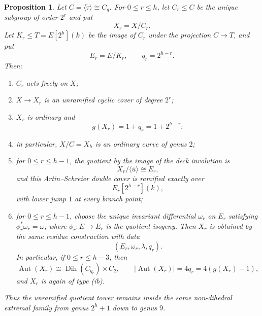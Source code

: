 \documentclass[10pt,a4paper]{amsart}
\newtheorem{proposition}{Proposition}
\newcommand{\Aut}{\operatorname{Aut}}
\newcommand{\Dih}{\operatorname{Dih}}
\begin{document}
\begin{proposition}\label{prop:tower}
Let $C=\langle\widetilde\tau\rangle\cong C_q$.  For
$0\le r\le h$, let $C_r\le C$ be the unique subgroup of order $2^r$ and
put
\[
 X_r=X/C_r.
\]
Let $K_r\le T=E[2^h](k)$ be the image of $C_r$ under the projection
$C\to T$, and put
\[
 E_r=E/K_r,\qquad q_r=2^{h-r}.
\]
Then:
\begin{enumerate}[label=\textup{(\roman*)}]
\item $C_r$ acts freely on $X$;
\item $X\to X_r$ is an unramified cyclic cover of degree $2^r$;
\item $X_r$ is ordinary and
\[
 g(X_r)=1+q_r=1+2^{h-r};
\]
\item in particular, $X/C=X_h$ is an ordinary curve of genus $2$;
\item for $0\le r\le h-1$, the quotient by the image of the deck
involution is
\[
 X_r/\langle\bar u\rangle\cong E_r,
\]
and this Artin--Schreier double cover is ramified exactly over
\[
 E_r[2^{h-r}](k),
\]
with lower jump $1$ at every branch point;
\item for $0\le r\le h-1$, choose the unique invariant differential
$\omega_r$ on $E_r$ satisfying $\phi_r^*\omega_r=\omega$, where
$\phi_r:E\to E_r$ is the quotient isogeny.  Then $X_r$ is obtained by the
same residue construction with data
\[
 (E_r,\omega_r,\lambda,q_r).
\]
In particular, if $0\le r\le h-3$, then
\[
 \Aut(X_r)\cong \Dih(C_{q_r})\times C_2,
 \qquad |\Aut(X_r)|=4q_r=4(g(X_r)-1),
\]
and $X_r$ is again of type \textup{(ib)}.
\end{enumerate}
Thus the unramified quotient tower remains inside the same non-dihedral
extremal family from genus $2^h+1$ down to genus $9$.
\end{proposition}
\end{document}

